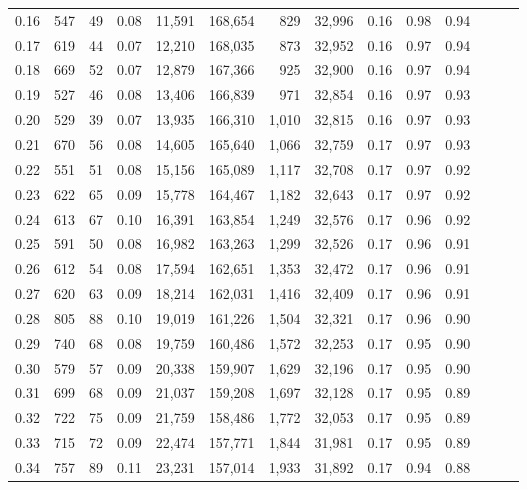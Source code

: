 \begin{tabular}{rrrrrrrrrrrrrr}
0.16 &    547 &     49 &  0.08 &   11,591 &  168,654 &     829 &  32,996 &  0.16 &  0.98 &      0.94 \\
0.17 &    619 &     44 &  0.07 &   12,210 &  168,035 &     873 &  32,952 &  0.16 &  0.97 &      0.94 \\
0.18 &    669 &     52 &  0.07 &   12,879 &  167,366 &     925 &  32,900 &  0.16 &  0.97 &      0.94 \\
0.19 &    527 &     46 &  0.08 &   13,406 &  166,839 &     971 &  32,854 &  0.16 &  0.97 &      0.93 \\
0.20 &    529 &     39 &  0.07 &   13,935 &  166,310 &   1,010 &  32,815 &  0.16 &  0.97 &      0.93 \\
0.21 &    670 &     56 &  0.08 &   14,605 &  165,640 &   1,066 &  32,759 &  0.17 &  0.97 &      0.93 \\
0.22 &    551 &     51 &  0.08 &   15,156 &  165,089 &   1,117 &  32,708 &  0.17 &  0.97 &      0.92 \\
0.23 &    622 &     65 &  0.09 &   15,778 &  164,467 &   1,182 &  32,643 &  0.17 &  0.97 &      0.92 \\
0.24 &    613 &     67 &  0.10 &   16,391 &  163,854 &   1,249 &  32,576 &  0.17 &  0.96 &      0.92 \\
0.25 &    591 &     50 &  0.08 &   16,982 &  163,263 &   1,299 &  32,526 &  0.17 &  0.96 &      0.91 \\
0.26 &    612 &     54 &  0.08 &   17,594 &  162,651 &   1,353 &  32,472 &  0.17 &  0.96 &      0.91 \\
0.27 &    620 &     63 &  0.09 &   18,214 &  162,031 &   1,416 &  32,409 &  0.17 &  0.96 &      0.91 \\
0.28 &    805 &     88 &  0.10 &   19,019 &  161,226 &   1,504 &  32,321 &  0.17 &  0.96 &      0.90 \\
0.29 &    740 &     68 &  0.08 &   19,759 &  160,486 &   1,572 &  32,253 &  0.17 &  0.95 &      0.90 \\
0.30 &    579 &     57 &  0.09 &   20,338 &  159,907 &   1,629 &  32,196 &  0.17 &  0.95 &      0.90 \\
0.31 &    699 &     68 &  0.09 &   21,037 &  159,208 &   1,697 &  32,128 &  0.17 &  0.95 &      0.89 \\
0.32 &    722 &     75 &  0.09 &   21,759 &  158,486 &   1,772 &  32,053 &  0.17 &  0.95 &      0.89 \\
0.33 &    715 &     72 &  0.09 &   22,474 &  157,771 &   1,844 &  31,981 &  0.17 &  0.95 &      0.89 \\
0.34 &    757 &     89 &  0.11 &   23,231 &  157,014 &   1,933 &  31,892 &  0.17 &  0.94 &      0.88 \\

\end{tabular}
